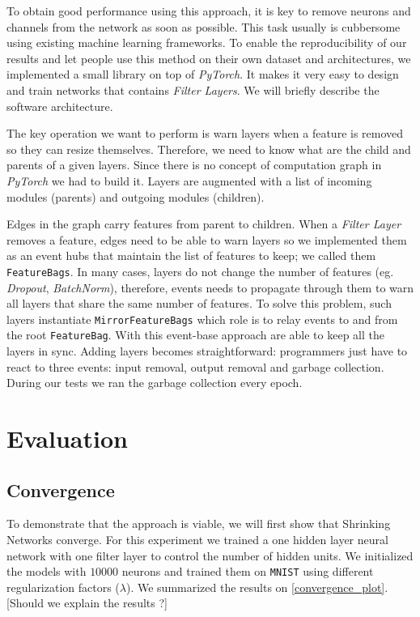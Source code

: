 \documentclass[sigconf]{acmart}
\begin{document}
To obtain good performance using this approach, it is key to remove neurons and channels from the network as soon as possible. This task usually is cubbersome using existing machine learning frameworks. To enable the reproducibility of our results and let people use this method on their own dataset and architectures, we implemented a small library on top of \textit{PyTorch}. It makes it very easy to design and train networks that contains \textit{Filter Layers}. We will briefly describe the software architecture.
\par The key operation we want to perform is warn layers when a feature is removed so they can resize themselves. Therefore, we need to know what are the child and parents of a given layers. Since there is no concept of computation graph in \textit{PyTorch} we had to build it. Layers are augmented with a list of incoming modules (parents) and outgoing modules (children).
\par Edges in the graph carry features from parent to children. When a \textit{Filter Layer} removes a feature, edges need to be able to warn layers so we implemented them as an event hubs that maintain the list of features to keep; we called them \texttt{FeatureBags}. In many cases, layers do not change the number of features (eg. \textit{Dropout}, \textit{BatchNorm}), therefore, events needs to propagate through them to warn all layers that share the same number of features. To solve this problem, such layers instantiate \texttt{MirrorFeatureBags} which role is to relay events to and from the root \texttt{FeatureBag}. With this event-base approach are able to keep all the layers in sync. Adding layers becomes straightforward: programmers just have to react to three events: input removal, output removal and garbage collection. During our tests we ran the garbage collection every epoch.

\section{Evaluation}
\subsection{Convergence}

To demonstrate that the approach is viable, we will first show that Shrinking Networks converge. For this experiment we trained a one hidden layer neural network with one filter layer to control the number of hidden units. We initialized the models with $10000$ neurons and trained them on \texttt{MNIST} using different regularization factors ($\lambda$). We summarized the results on \autoref{convergence_plot}. [Should we explain the results ?]
\end{document}
